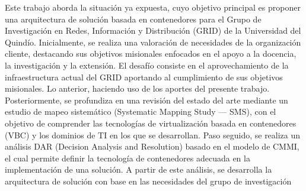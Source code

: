 Este trabajo aborda la situación ya expuesta, cuyo objetivo principal es proponer una arquitectura de solución basada en contenedores para el Grupo de Investigación en Redes, Información y Distribución (GRID) de la Universidad del Quindío. Inicialmente, se realiza una valoración de necesidades de la organización cliente, destacando sus objetivos misionales enfocados en el apoyo a la docencia, la investigación y la extensión. El desafío consiste en el aprovechamiento de la infraestructura actual del GRID aportando al cumplimiento de sus objetivos misionales. Lo anterior, haciendo uso de los aportes del presente trabajo. Posteriormente, se profundiza en una revisión del estado del arte mediante un estudio de mapeo sistemático (Systematic Mapping Study --- SMS), con el objetivo de comprender las tecnologías de virtualización basada en contenedores (VBC) y los dominios de TI en los que se desarrollan. Paso seguido, se realiza un análisis DAR (Decision Analysis and Resolution) basado en el modelo de CMMI, el cual permite definir la tecnología de contenedores adecuada en la implementación de una solución. A partir de este análisis, se desarrolla la arquitectura de solución con base en las necesidades del grupo de investigación 